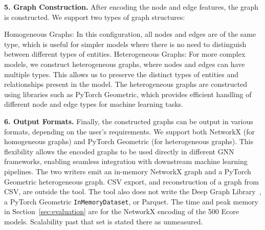 \documentclass[journal,article,submit,moreauthors,technologies]{Definitions/mdpi}
\newcommand{\rev}[1]{#1}
\begin{document}
\textbf{5. Graph Construction.}
After encoding the node and edge features, the graph is constructed. We support two types of graph structures:

Homogeneous Graphs: In this configuration, all nodes and edges are of the same type, which is useful for simpler models where there is no need to distinguish between different types of entities.
Heterogeneous Graphs: For more complex models, we construct heterogeneous graphs, where nodes and edges can have multiple types. This allows us to preserve the distinct types of entities and relationships present in the model. The heterogeneous graphs are constructed using libraries such as PyTorch Geometric, which provides efficient handling of different node and edge types for machine learning tasks.

\textbf{6. Output Formats.}
Finally, the constructed graphs can be output in various formats, depending on the user's requirements. We support both NetworkX (for homogeneous graphs) and PyTorch Geometric (for heterogeneous graphs). This flexibility allows the encoded graphs to be used directly in different GNN frameworks, enabling seamless integration with downstream machine learning pipelines.
\rev{The two writers emit an in-memory NetworkX graph and a PyTorch Geometric heterogeneous graph. CSV export, and reconstruction of a graph from CSV, are outside the tool. The tool also does not write the Deep Graph Library~\cite{wang2019deep}, a PyTorch Geometric \texttt{InMemoryDataset}, or Parquet. The time and peak memory in Section~\ref{sec:evaluation} are for the NetworkX encoding of the 500 Ecore models. Scalability past that set is stated there as unmeasured.}
\end{document}
